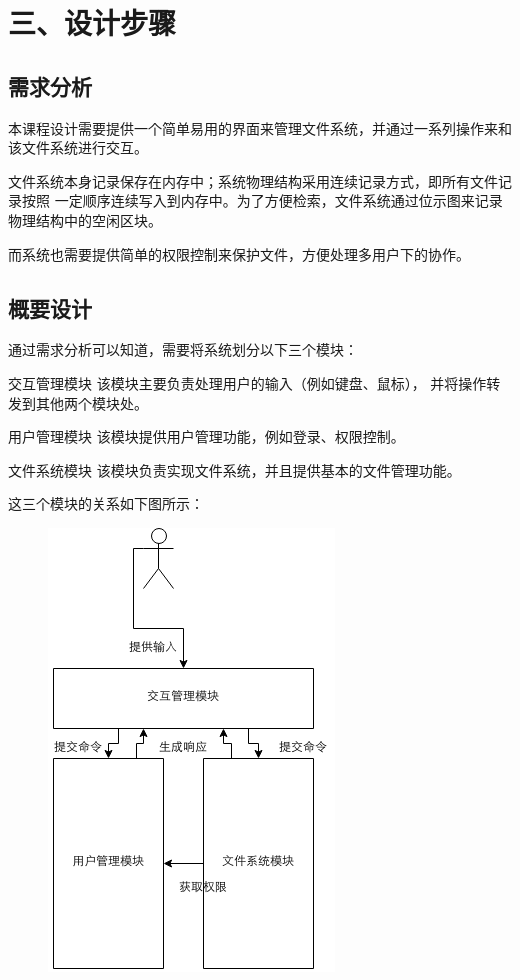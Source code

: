 \documentclass[12bp]{guo}
\begin{document}
\section{三、设计步骤}

\subsection{需求分析}

本课程设计需要提供一个简单易用的界面来管理文件系统，并通过一系列操作来和
该文件系统进行交互。


文件系统本身记录保存在内存中；系统物理结构采用连续记录方式，即所有文件记录按照
一定顺序连续写入到内存中。为了方便检索，文件系统通过位示图来记录物理结构中的空闲区块。


而系统也需要提供简单的权限控制来保护文件，方便处理多用户下的协作。

\subsection{概要设计}

通过需求分析可以知道，需要将系统划分以下三个模块：

\begin{description}
    \item{交互管理模块} 该模块主要负责处理用户的输入（例如键盘、鼠标），
                        并将操作转发到其他两个模块处。
    \item{用户管理模块} 该模块提供用户管理功能，例如登录、权限控制。
    \item{文件系统模块} 该模块负责实现文件系统，并且提供基本的文件管理功能。
\end{description}

这三个模块的关系如下图所示：

\begin{figure}[h!]
    \centering
        \includegraphics[scale=0.75]{figures/fs-app.module.png}
\end{figure}
\end{document}
